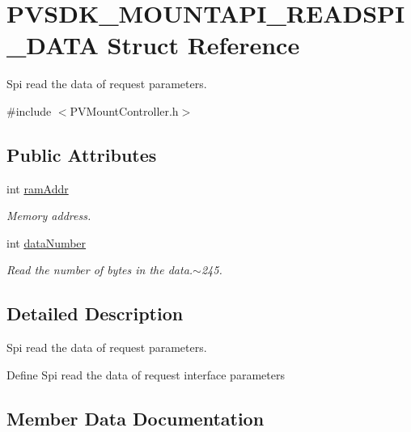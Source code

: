 \hypertarget{struct_p_v_s_d_k___m_o_u_n_t_a_p_i___r_e_a_d_s_p_i___d_a_t_a}{}\section{P\+V\+S\+D\+K\+\_\+\+M\+O\+U\+N\+T\+A\+P\+I\+\_\+\+R\+E\+A\+D\+S\+P\+I\+\_\+\+D\+A\+TA Struct Reference}
\label{struct_p_v_s_d_k___m_o_u_n_t_a_p_i___r_e_a_d_s_p_i___d_a_t_a}


Spi read the data of request parameters.  




{\ttfamily \#include $<$P\+V\+Mount\+Controller.\+h$>$}

\subsection*{Public Attributes}
\begin{DoxyCompactItemize}
\item 
int \hyperlink{struct_p_v_s_d_k___m_o_u_n_t_a_p_i___r_e_a_d_s_p_i___d_a_t_a_ae12dde2fcdf659be7a0642ed6c5511aa}{ram\+Addr}
\begin{DoxyCompactList}\small\item\em Memory address. \end{DoxyCompactList}\item 
int \hyperlink{struct_p_v_s_d_k___m_o_u_n_t_a_p_i___r_e_a_d_s_p_i___d_a_t_a_aadcabc724610919db0b0a552abf460b9}{data\+Number}
\begin{DoxyCompactList}\small\item\em Read the number of bytes in the data.$\sim$245. \end{DoxyCompactList}\end{DoxyCompactItemize}


\subsection{Detailed Description}
Spi read the data of request parameters. 

Define Spi read the data of request interface parameters 

\subsection{Member Data Documentation}
\mbox{\label{struct_p_v_s_d_k___m_o_u_n_t_a_p_i___r_e_a_d_s_p_i___d_a_t_a_aadcabc724610919db0b0a552abf460b9}} 
